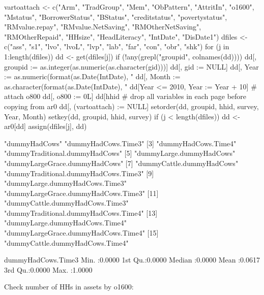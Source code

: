\begin{Schunk}
\begin{Sinput}
vartoattach <- c("Arm", "TradGroup", "Mem", 
  "ObPattern", "AttritIn", "o1600", 
  "Mstatus", "BorrowerStatus", "BStatus",
  "creditstatus", "povertystatus", "RMvalue.repay", 
  "RMvalue.NetSaving", "RMOtherNetSaving", "RMOtherRepaid",
  "HHsize", "HeadLiteracy", "IntDate", "DisDate1")
dfiles <- c("ass", "s1", "lvo", "lvoL", "lvp", "lab", "far", "con", "obr", "shk")
for (j in 1:length(dfiles)) {
  dd <- get(dfiles[j])
  if (!any(grepl("groupid", colnames(dd)))) {
    dd[, groupid := as.integer(as.numeric(as.character(gid)))]
    dd[, gid := NULL]
  }
  dd[, Year :=  as.numeric(format(as.Date(IntDate), "%Y"))]
  dd[, Month := as.character(format(as.Date(IntDate), "%B"))]
  dd[Year <= 2010, Year := Year + 10]
  # attach o800
  dd[, o800 := 0L]
  dd[hhid %in% jds[grepl("trea", treat), hhid], o800 := 1L]
  # drop all variables in each page before copying from ar0
  dd[, (vartoattach) := NULL]
  setorder(dd, groupid, hhid, survey, Year, Month)
  setkey(dd, groupid, hhid, survey)
  if (j < length(dfiles)) dd <- ar0[dd]
  assign(dfiles[j], dd)
}
\end{Sinput}
\end{Schunk}
\begin{Schunk}
\begin{Soutput}
 [1] "dummyHadCows"                        "dummyHadCows.Time3"                 
 [3] "dummyHadCows.Time4"                  "dummyTraditional.dummyHadCows"      
 [5] "dummyLarge.dummyHadCows"             "dummyLargeGrace.dummyHadCows"       
 [7] "dummyCattle.dummyHadCows"            "dummyTraditional.dummyHadCows.Time3"
 [9] "dummyLarge.dummyHadCows.Time3"       "dummyLargeGrace.dummyHadCows.Time3" 
[11] "dummyCattle.dummyHadCows.Time3"      "dummyTraditional.dummyHadCows.Time4"
[13] "dummyLarge.dummyHadCows.Time4"       "dummyLargeGrace.dummyHadCows.Time4" 
[15] "dummyCattle.dummyHadCows.Time4"     
\end{Soutput}
\begin{Soutput}
 dummyHadCows.Time3
 Min.   :0.0000    
 1st Qu.:0.0000    
 Median :0.0000    
 Mean   :0.0617    
 3rd Qu.:0.0000    
 Max.   :1.0000    
\end{Soutput}
\end{Schunk}
Check number of HHs in assets by \textsf{o1600}:
